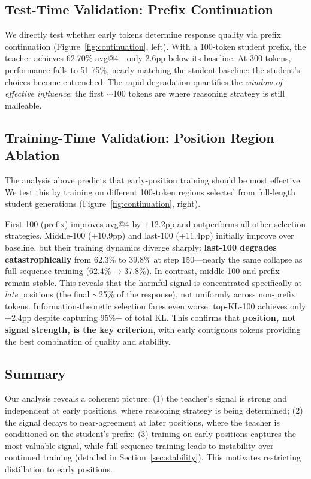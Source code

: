 \documentclass[10pt]{article}
\begin{document}
\subsection{Test-Time Validation: Prefix Continuation}
\label{sec:continuation}

We directly test whether early tokens determine response quality via prefix continuation (Figure~\ref{fig:continuation}, left). With a 100-token student prefix, the teacher achieves 62.70\% avg@4---only 2.6pp below its baseline. At 300 tokens, performance falls to 51.75\%, nearly matching the student baseline: the student's choices become entrenched. The rapid degradation quantifies the \emph{window of effective influence}: the first $\sim$100 tokens are where reasoning strategy is still malleable.

\subsection{Training-Time Validation: Position Region Ablation}
\label{sec:position_ablation}

The analysis above predicts that early-position training should be most effective. We test this by training on different 100-token regions selected from full-length student generations (Figure~\ref{fig:continuation}, right).

First-100 (prefix) improves avg@4 by +12.2pp and outperforms all other selection strategies. Middle-100 (+10.9pp) and last-100 (+11.4pp) initially improve over baseline, but their training dynamics diverge sharply: \textbf{last-100 degrades catastrophically} from 62.3\% to 39.8\% at step 150---nearly the same collapse as full-sequence training (62.4\%$\to$37.8\%). In contrast, middle-100 and prefix remain stable. This reveals that the harmful signal is concentrated specifically at \emph{late} positions (the final ${\sim}$25\% of the response), not uniformly across non-prefix tokens. Information-theoretic selection fares even worse: top-KL-100 achieves only +2.4pp despite capturing 95\%+ of total KL. This confirms that \textbf{position, not signal strength, is the key criterion}, with early contiguous tokens providing the best combination of quality and stability.


\subsection{Summary}
\label{sec:hypothesis}

Our analysis reveals a coherent picture: (1) the teacher's signal is strong and independent at early positions, where reasoning strategy is being determined; (2) the signal decays to near-agreement at later positions, where the teacher is conditioned on the student's prefix; (3) training on early positions captures the most valuable signal, while full-sequence training leads to instability over continued training (detailed in Section~\ref{sec:stability}). This motivates restricting distillation to early positions.
\end{document}
